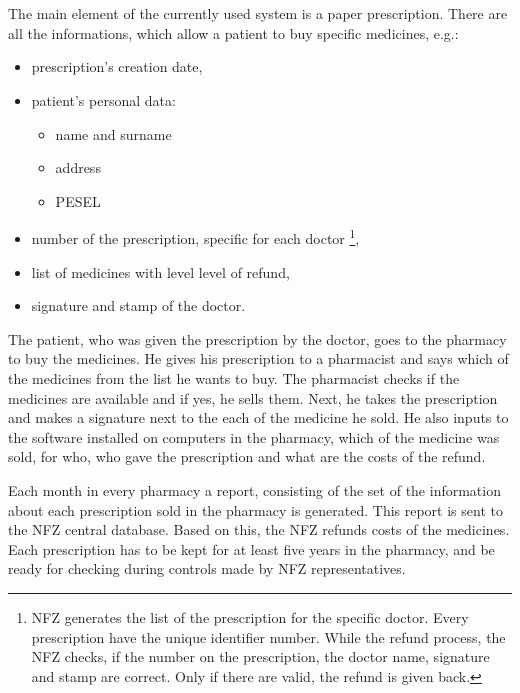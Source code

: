\chapter{   }

The main element of the currently used system is a paper prescription. There are all the informations, which allow a patient to buy specific medicines, e.g.: 

\begin{itemize}
  \item prescription’s creation date,
  \item patient’s personal data:
  \begin{itemize}
	  \item name and surname
	  \item address
	  \item PESEL
  \end{itemize}
  \item number of the prescription, specific for each doctor \footnote{NFZ generates the list of the prescription for the specific doctor. Every prescription have the unique identifier number. While the refund process, the NFZ checks, if the number on the prescription, the doctor name, signature and stamp are correct. Only if there are valid, the refund is given back.  },
  \item list of medicines with level level of refund,
  \item signature and stamp of the doctor. 
\end{itemize}

The patient, who was given the prescription by the doctor, goes to the pharmacy to buy the medicines. He gives his prescription to a pharmacist and says which of the medicines from the list he wants to buy. The pharmacist checks if the medicines are available and if yes, he sells them. Next, he takes the prescription and makes a signature next to the each of the medicine he sold. He also inputs to the software installed on computers in the pharmacy, which of the medicine was sold, for who, who gave the prescription and what are the costs of the refund.

Each month in every pharmacy a report, consisting of  the set of the information about each prescription sold in the pharmacy is generated. This report is sent to the NFZ central database. Based on this, the NFZ refunds costs of the medicines. Each prescription has to be kept for at least five years in the pharmacy, and be ready for checking during controls made by NFZ representatives. 

